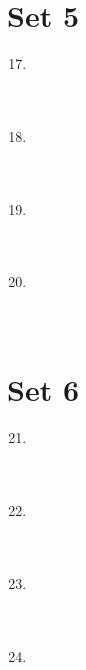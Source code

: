 \documentclass[11pt]{article}
\begin{document}
\eject

\section*{Set 5}

\begin{multicols*}{1} \begin{enumerate} 
\setcounter{enumi}{16}

\item \underline{\phantom{000000000000000}} \\ \\ \\
\item \underline{\phantom{000000000000000}} \\ \\ \\
\item \underline{\phantom{000000000000000}} \\ \\ \\
\item \underline{\phantom{000000000000000}} \\ \\ \\

\end{enumerate} \end{multicols*}

\eject

\section*{Set 6}

\begin{multicols*}{1} \begin{enumerate} 
\setcounter{enumi}{20}

\item \underline{\phantom{000000000000000}} \\ \\ \\
\item \underline{\phantom{000000000000000}} \\ \\ \\
\item \underline{\phantom{000000000000000}} \\ \\ \\
\item \underline{\phantom{000000000000000}} \\ \\ \\

\end{enumerate} \end{multicols*}
\end{document}
